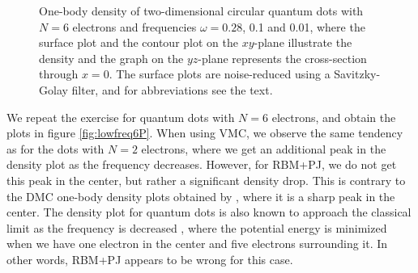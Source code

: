 \begin{figure}
	\hspace{0.1cm}
	\hspace{-0.cm}
	\hspace{-0.cm}
	
	\caption{One-body density of two-dimensional circular quantum dots with $N=6$ electrons and frequencies $\omega=0.28$, 0.1 and 0.01, where the surface plot and the contour plot on the $xy$-plane illustrate the density and the graph on the $yz$-plane represents the cross-section through $x=0$. The surface plots are noise-reduced using a Savitzky-Golay filter, and for abbreviations see the text.}
	\label{fig:lowfreq6P}
\end{figure}

We repeat the exercise for quantum dots with $N=6$ electrons, and obtain the plots in figure \eqref{fig:lowfreq6P}. When using VMC, we observe the same tendency as for the dots with $N=2$ electrons, where we get an additional peak in the density plot as the frequency decreases. However, for RBM+PJ, we do not get this peak in the center, but rather a significant density drop. This is contrary to the DMC one-body density plots obtained by \citet{hogberget_quantum_2013}, where it is a sharp peak in the center. The density plot for quantum dots is also known to approach the classical limit as the frequency is decreased \cite{ghosal_incipient_2007}, where the potential energy is minimized when we have one electron in the center and five electrons surrounding it. In other words, RBM+PJ appears to be wrong for this case. 

